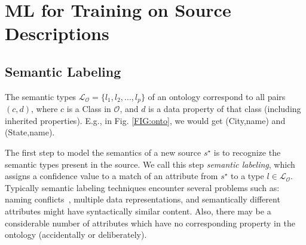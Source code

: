 \documentclass[letterpaper]{article} %
\newcommand{\authornote}[3]{
  {\fbox{\sc 
  #1}:$\blacktriangleright$\textcolor{#2}{\small{#3}}$\blacktriangleleft$}%
}
\newcommand{\ddg}[1]{\authornote{DDG}{blue}{#1}}
\begin{document}
\section{ML for Training on Source Descriptions \label{SEC:ML}}


\subsection{Semantic Labeling}
The semantic types $\mathcal{L_O} = \{l_1, l_2, ..., l_p\}$ of an ontology 
correspond to all pairs $(c,d)$, where $c$ is a Class in $\mathcal{O}$, and $d$ 
is a data property of that class (including inherited properties). 
E.g., in Fig. \ref{FIG:onto}, we would get
(City,name) and (State,name).

The first step to model the semantics of a new source $s^\star$ is to recognize the semantic types present in the source. 
We call this step \emph{semantic labeling}, which assigns a confidence value to a match of an attribute from $s^\star$ to a type $l \in 
\mathcal{L_O}$.
Typically semantic labeling techniques encounter several problems such as:
naming conflicts~\cite{Pinkel:rodi}, multiple data representations, and semantically different attributes might have syntactically similar 
content. %
Also, there may be a considerable number of attributes which have no 
corresponding property in the ontology (accidentally or deliberately).
\end{document}
